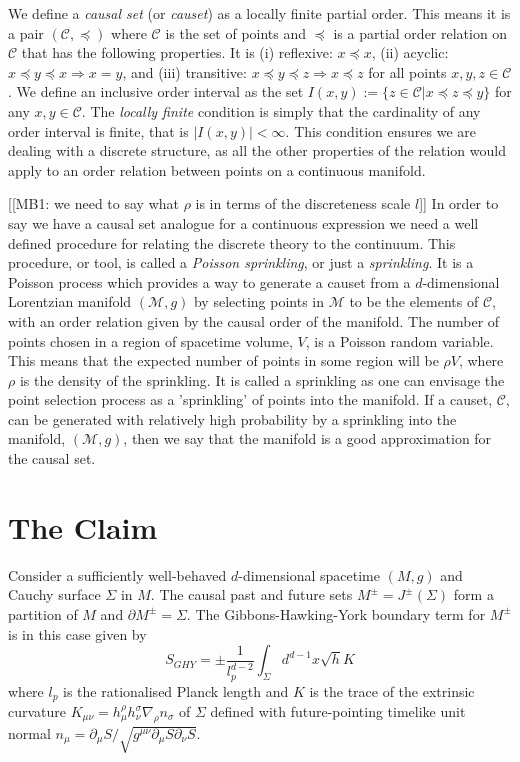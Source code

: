 \documentclass[12pt]{article}
\begin{document}
We define a \textit{causal set} (or \textit{causet}) as a locally finite partial order. This means it is a pair $(\mathcal{C},\preceq)$ where $\mathcal{C}$ is the set of points and $\preceq$ is a partial order relation on $\mathcal{C}$ that has the following properties. It is (i) reflexive: $x\preceq x$, (ii) acyclic: $x\preceq y\preceq x \Rightarrow x=y$, and (iii) transitive: $x\preceq y\preceq z \Rightarrow x\preceq z$ for all points $x, y, z \in \mathcal{C}$. We define an inclusive order interval as the set $I(x,y):=\lbrace z\in\mathcal{C}|x\preceq z\preceq y\rbrace$ for any $x, y\in\mathcal{C}$. The \textit{locally finite} condition is simply that the cardinality of any order interval is finite, that is $|I(x,y)|<\infty$. This condition ensures we are dealing with a discrete structure, as all the other properties of the relation would apply to an order relation between points on a continuous manifold.

[[MB1: we need to say what $\rho$ is in terms of the discreteness scale $l$]] In order to say we have a causal set analogue for a continuous expression we need a well defined procedure for relating the discrete theory to the continuum. This procedure, or tool, is called a \textit{Poisson sprinkling}, or just a \textit{sprinkling}. It is a Poisson process which provides a way to generate a causet from a $d$-dimensional Lorentzian manifold $(\mathcal{M},g)$ by selecting points in $\mathcal{M}$ to be the elements of $\mathcal{C}$, with an order relation given by the causal order of the manifold. The number of points chosen in a region of spacetime volume, $V$, is a Poisson random variable. This means that the expected number of points in some region will be $\rho V$, where $\rho$ is the density of the sprinkling. It is called a sprinkling as one can envisage the point selection process as a 'sprinkling' of points into the manifold. If a causet, $\mathcal{C}$, can be generated with relatively high probability by a sprinkling into the manifold, $(\mathcal{M},g)$, then we say that the manifold is a good approximation for the causal set.

\section{The Claim}

Consider a sufficiently well-behaved $d$-dimensional spacetime $(M,g)$ and Cauchy surface $\Sigma$ in $M$. The causal past and future sets $M^\pm=J^\pm(\Sigma)$ form a partition of $M$ and $\partial M^\pm = \Sigma$. The Gibbons-Hawking-York boundary term for $M^\pm$ is in this case given by
$$
S_{GHY} = \pm \frac{1}{l_p^{d-2}}\int_{\Sigma} d^{d-1}x \sqrt{h} K
$$
where $l_p$ is the rationalised Planck length and $K$ is the trace of the extrinsic curvature $K_{\mu\nu}=h_{\mu}^\rho h_\nu^\sigma \nabla_\rho n_\sigma$ of $\Sigma$ defined with future-pointing timelike unit normal $n_{\mu}=\partial_\mu S/\sqrt{g^{\mu\nu}\partial_\mu S\partial_\nu S}$. 
\end{document}
